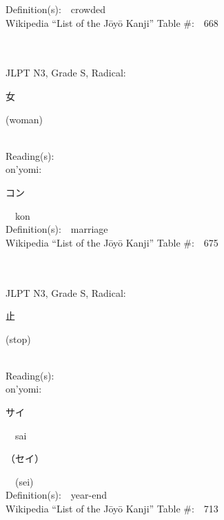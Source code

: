 \begin{multicols}{2}
Definition(s):\ \ crowded \\
Wikipedia ``List of the J\=oy\=o Kanji'' Table \#:\ \ 668 \\
\ \ \\
{\fontsize{34pt}{40pt}  }\ \ \\  %
{JLPT N3, Grade S, Radical:\ \ {\begin{CJK}{UTF8}{min} 女 \end{CJK}} (woman) } \\
Reading(s):\ \ \\
{\hspace*{1em}}on'yomi:\ \ \\
{\hspace*{2em}}{\begin{CJK}{UTF8}{min} コン \end{CJK}}\ \ kon\ \ \\
Definition(s):\ \ marriage \\
Wikipedia ``List of the J\=oy\=o Kanji'' Table \#:\ \ 675 \\
\ \ \\
{\fontsize{34pt}{40pt}  }\ \ \\  %
{JLPT N3, Grade S, Radical:\ \ {\begin{CJK}{UTF8}{min} 止 \end{CJK}} (stop) } \\
Reading(s):\ \ \\
{\hspace*{1em}}on'yomi:\ \ \\
{\hspace*{2em}}{\begin{CJK}{UTF8}{min} サイ \end{CJK}}\ \ sai\ \ \\
{\hspace*{2em}}{\begin{CJK}{UTF8}{min} （セイ） \end{CJK}}\ \ (sei)\ \ \\
Definition(s):\ \ year-end \\
Wikipedia ``List of the J\=oy\=o Kanji'' Table \#:\ \ 713 \\
\ \ \\

\end{multicols}
